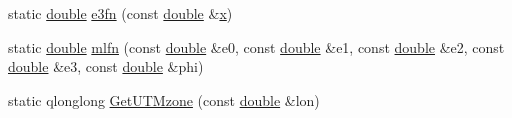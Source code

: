\begin{DoxyCompactItemize}
static \hyperlink{_super_l_u_support_8h_a8956b2b9f49bf918deed98379d159ca7}{double} \hyperlink{group___o_p_map_widget_ga42266b37884ed2a7b650fdd830dd2ce2}{e3fn} (const \hyperlink{_super_l_u_support_8h_a8956b2b9f49bf918deed98379d159ca7}{double} \&\hyperlink{glext_8h_a1db9d104e3c2128177f26aff7b46982f}{x})
\item 
static \hyperlink{_super_l_u_support_8h_a8956b2b9f49bf918deed98379d159ca7}{double} \hyperlink{group___o_p_map_widget_ga5be16c4bd50c6869390aa8e1fa81d44d}{mlfn} (const \hyperlink{_super_l_u_support_8h_a8956b2b9f49bf918deed98379d159ca7}{double} \&e0, const \hyperlink{_super_l_u_support_8h_a8956b2b9f49bf918deed98379d159ca7}{double} \&e1, const \hyperlink{_super_l_u_support_8h_a8956b2b9f49bf918deed98379d159ca7}{double} \&e2, const \hyperlink{_super_l_u_support_8h_a8956b2b9f49bf918deed98379d159ca7}{double} \&e3, const \hyperlink{_super_l_u_support_8h_a8956b2b9f49bf918deed98379d159ca7}{double} \&phi)
\item 
static qlonglong \hyperlink{group___o_p_map_widget_ga4fe99842f3ee0de090c40b11999ab860}{Get\-U\-T\-Mzone} (const \hyperlink{_super_l_u_support_8h_a8956b2b9f49bf918deed98379d159ca7}{double} \&lon)
\end{DoxyCompactItemize}
